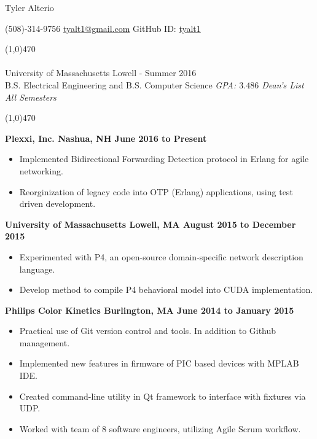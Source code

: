 \documentclass[11pt, a4paper]{article} %
\newcommand{\tinybullet}{ {\tiny \textbullet} }
\begin{document}
\centerline{\Huge \sc Tyler Alterio}

\centerline{
(508)-314-9756 \tinybullet \hspace{1pt}
\href{mailto:tyalt1@gmail.com}{tyalt1@gmail.com} \tinybullet \hspace{1pt}
GitHub ID: \href{http://www.github.com/tyalt1}{tyalt1}
}

\noindent \line(1,0){470}\\

\smallskip \\
University of Massachusetts Lowell - Summer 2016 \\
B.S. Electrical Engineering and B.S. Computer Science
\hfill {\it GPA: $3.486$ \tinybullet \hspace{1pt} Dean's List All Semesters}

\noindent \line(1,0){470}\\

\vspace{5pt}

\centerline{\bf Plexxi, Inc. \tinybullet \hspace{1pt} Nashua, NH \hfill June 2016 to Present}
\begin{itemize}
\itemsep0em
	\item Implemented Bidirectional Forwarding Detection protocol in Erlang for agile networking.
	\item Reorginization of legacy code into OTP (Erlang) applications, using test driven development.
\end{itemize}

\centerline{\bf University of Massachusetts \tinybullet \hspace{1pt} Lowell, MA \hfill August 2015 to December 2015}
\begin{itemize}
\itemsep0em
	\item Experimented with P4, an open-source domain-specific network description language.
	\item Develop method to compile P4 behavioral model into CUDA implementation.
\end{itemize}

\centerline{\bf Philips Color Kinetics \tinybullet \hspace{1pt} Burlington, MA \hfill June 2014 to January 2015}
\begin{itemize}
\itemsep0em
	\item Practical use of Git version control and tools. In addition to Github management.
	\item Implemented new features in firmware of PIC based devices with MPLAB IDE.
	\item Created command-line utility in Qt framework to interface with fixtures via UDP.
	\item Worked with team of 8 software engineers, utilizing Agile Scrum workflow.
\end{itemize}
\end{document}

